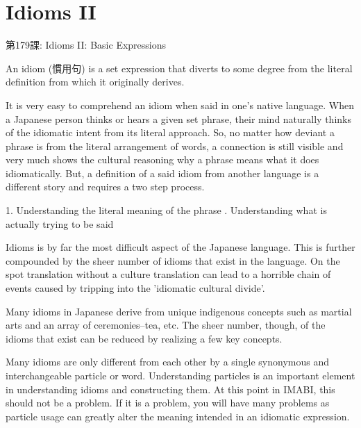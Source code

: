     
\chapter{Idioms II}

\begin{center}
\begin{Large}
第179課: Idioms II: Basic Expressions 
\end{Large}
\end{center}
 
\par{ An idiom (慣用句) is a set expression that diverts to some degree from the literal definition from which it originally derives. }

\par{It is very easy to comprehend an idiom when said in one's native language. When a Japanese person thinks or hears a given set phrase, their mind naturally thinks of the idiomatic intent from its literal approach. So, no matter how deviant a phrase is from the literal arrangement of words, a connection is still visible and very much shows the cultural reasoning why a phrase means what it does idiomatically. But, a definition of a said idiom from another language is a different story and requires a two step process. }

\par{1. Understanding the literal meaning of the phrase \hfill{}. Understanding what is actually trying to be said }

\par{Idioms is by far the most difficult aspect of the Japanese language. This is further compounded by the sheer number of idioms that exist in the language. On the spot translation without a culture translation can lead to a horrible chain of events caused by tripping into the 'idiomatic cultural divide'. }

\par{Many idioms in Japanese derive from unique indigenous concepts such as martial arts and an array of ceremonies--tea, etc. The sheer number, though, of the idioms that exist can be reduced by realizing a few key concepts. }

\par{Many idioms are only different from each other by a single synonymous and interchangeable particle or word. Understanding particles is an important element in understanding idioms and constructing them. At this point in IMABI, this should not be a problem. If it is a problem, you will have many problems as particle usage can greatly alter the meaning intended in an idiomatic expression. }

